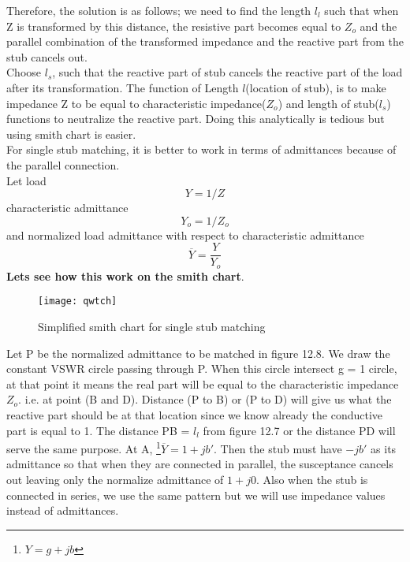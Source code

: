 Therefore, the solution is as follows; we need to find the length $ l_l$  such that when Z is transformed by this distance, the resistive part becomes equal to $Z_o$ and the parallel combination of the transformed impedance and the reactive part from the stub cancels out.\\

Choose $l_s$, such that the reactive part of stub cancels the reactive part of the load after its transformation. The function of Length $l$(location of stub), is to make impedance Z to be equal to characteristic impedance($Z_o$) and length of stub($l_s$) functions to neutralize the reactive part. Doing this analytically  is tedious but using smith chart is easier.\\

For single stub matching, it is better to work in terms of admittances because of the parallel connection.\\
Let load 
\begin{equation}
Y = 1/Z
\end{equation}
characteristic admittance 
\begin{equation} Y_o = 1/Z_o\end{equation} 
and normalized load admittance with respect to characteristic admittance 
\begin{equation} 
\overline{Y}=\frac{Y}{Y_o} 
\end{equation}
\textbf{Lets see how this work on the smith chart}. %
\begin{figure}[h]
	\centering
	\texttt{[image: qwtch]}
	\caption{Simplified smith chart for single stub matching}
\end{figure}
 Let P be the normalized admittance to be matched in figure 12.8. We draw the constant VSWR circle passing through P. When this circle intersect g = 1 circle, at that point it means the real part will be equal to the characteristic impedance $Z_o$. i.e. at point (B and D). Distance (P to B) or (P to D) will give us what the reactive
 part should be at that location since we know already the conductive part is equal to 1. The distance PB = $l_l$ from figure 12.7 or the distance PD will serve the same purpose. At A, \footnote{$Y = g + jb$}$\overline{Y} = 1 + jb' $. Then the stub must have $-jb'$ as its admittance so that when they are connected in parallel, the susceptance cancels out leaving only the normalize admittance of $1 + j0$.
Also when the stub is connected in series, we use the same pattern but we will use impedance values instead of admittances.\\
